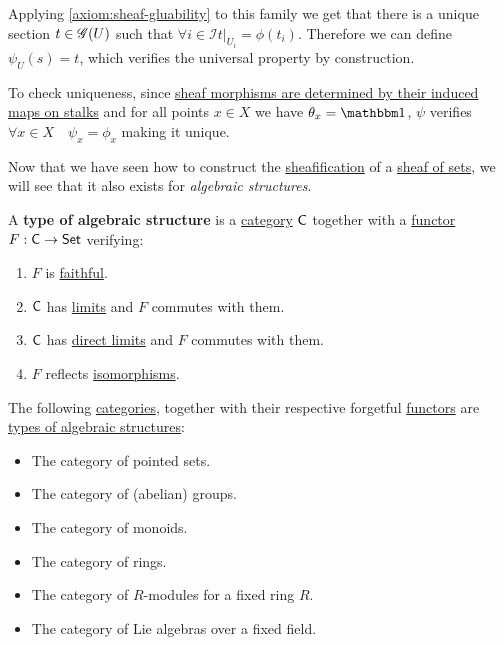 \documentclass[../../../main]{subfiles}
\begin{document}
\begin{construction}
  Applying \ref{axiom:sheaf-gluability} to this family we get that there is a unique section \(t \in \mathscr{G}(U)\) such that \(\forall i \in \mathcal{I} t|_{U_{i}} = \phi(t_{i})\).
  Therefore we can define \(\psi_{U}(s) = t\), which verifies the universal property by construction.

  To check uniqueness, since \hyperref[prop:sheaf-morphism-and-stalks]{sheaf morphisms are determined by their induced maps on stalks} and for all points \(x \in X\) we have \(\theta_{x} = \id\), \(\psi\) verifies \(\forall x \in X \quad \psi_{x} = \phi_{x}\) making it unique.
\end{construction}

Now that we have seen how to construct the \hyperref[def:sheafification]{sheafification} of a \hyperref[def:set-valued-sheaf]{sheaf of sets}, we will see that it also exists for \textit{algebraic structures}.

\begin{definition} \label{def:algebraic-structure}
  A \textbf{type of algebraic structure} is a \hyperref[def:category]{category} \(\mathsf{C}\) together with a \hyperref[def:functor]{functor} \(F: \mathsf{C} \to \mathsf{Set}\) verifying:
  \begin{enumerate}
    \item \(F\) is \hyperref[def:functor-types]{faithful}.
    \item \(\mathsf{C}\) has \hyperref[def:categorical-limit]{limits} and \(F\) commutes with them.
    \item \(\mathsf{C}\) has \hyperref[def:direct-limit]{direct limits} and \(F\) commutes with them.
    \item \(F\) reflects \hyperref[def:categorical-isomorphism]{isomorphisms}.
  \end{enumerate}
\end{definition}

\begin{example}
  The following \hyperref[def:category]{categories}, together with their respective forgetful \hyperref[def:functor]{functors} are \hyperref[def:algebraic-structure]{types of algebraic structures}:
  \begin{itemize}
    \item The category of pointed sets.
    \item The category of (abelian) groups.
    \item The category of monoids.
    \item The category of rings.
    \item The category of \(R\)-modules for a fixed ring \(R\).
    \item The category of Lie algebras over a fixed field.
  \end{itemize}
\end{example}
\end{document}
